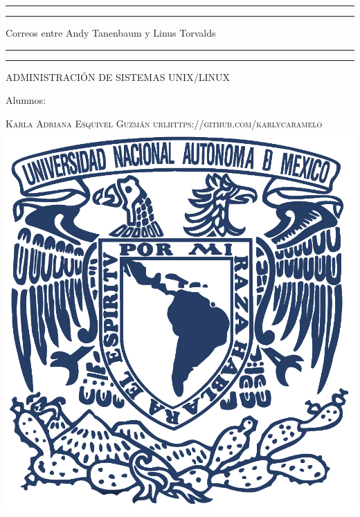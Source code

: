 \documentclass[a4paper, 11pt, oneside]{article}
\begin{document}
 

\begin{titlepage} 

	\centering 
	
	\scshape 
	
	\vspace*{\baselineskip} 
	
	
	
	\rule{\textwidth}{1.6pt}\vspace*{-\baselineskip}\vspace*{2pt} 
	\rule{\textwidth}{0.4pt} 
	
	\vspace{0.75\baselineskip} 
	
	{\LARGE Correos entre Andy Tanenbaum y Linus Torvalds}	
	\vspace{0.75\baselineskip} 
	
	\rule{\textwidth}{0.4pt}\vspace*{-\baselineskip}\vspace{3.2pt}
	\rule{\textwidth}{1.6pt} 
	
	\vspace{2\baselineskip} 
	

	ADMINISTRACIÓN DE SISTEMAS UNIX/LINUX
	
	\vspace*{3\baselineskip} 
	
	
	
	Alumnos:
	
	\vspace{0.5\baselineskip} 
	
	{\scshape\Large Karla Adriana Esquivel Guzmán url{https://github.com/karlycaramelo} \\}
	\vspace{0.5\baselineskip} 
	\vfill
	\includegraphics[scale=0.65]{unam.jpg}
	

\end{titlepage}
\end{document}
